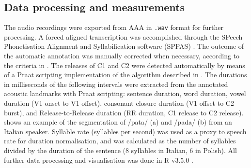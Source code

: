 \documentclass[preprint]{JASAnew}
\begin{document}
\hypertarget{data-processing-and-measurements}{%
\subsection{Data processing and
measurements}\label{data-processing-and-measurements}}


The audio recordings were exported from AAA in \texttt{.wav} format for
further processing. A forced aligned transcription was accomplished
through the SPeech Phonetisation Alignment and Syllabification software
(SPPAS) \citep{bigi2015}. The outcome of the automatic annotation was
manually corrected when necessary, according to the criteria in
. The releases of C1 and C2 were detected
automatically by means of a Praat scripting implementation of the
algorithm described in \citet{ananthapadmanabha2014}. The durations in
milliseconds of the following intervals were extracted from the
annotated acoustic landmarks with Praat scripting: sentence duration,
word duration, vowel duration (V1 onset to V1 offset), consonant closure
duration (V1 offset to C2 burst), and Release-to-Release duration (RR
duration, C1 release to C2 release).  shows an
example of the segmentation of /pata/ (a) and /pada/ (b) from an Italian
speaker. Syllable rate (syllables per second) was used as a proxy to
speech rate \citep{plug2018} for duration normalisation, and was
calculated as the number of syllables divided by the duration of the
sentence (8 syllables in Italian, 6 in Polish). All further data
processing and visualisation was done in R v3.5.0
\citep{r-core-team2018, wickham2017}.
\end{document}
